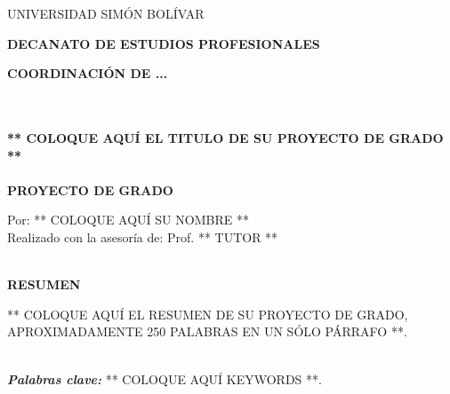 \watermarkoff
\begin{resumen}
\begin{center}
\begin{large}
	UNIVERSIDAD SIMÓN BOLÍVAR
\end{large}

\textbf{DECANATO DE ESTUDIOS PROFESIONALES}

\textbf{COORDINACIÓN DE ...}

~\\
~\\
\textbf{** COLOQUE AQUÍ EL TITULO DE SU PROYECTO DE GRADO **}
~\\
~\\
\textbf{PROYECTO DE GRADO}


Por: ** COLOQUE AQUÍ SU NOMBRE **\\
Realizado con la asesoría de: Prof. ** TUTOR **

~\\

\textbf{RESUMEN}
\end{center}



** COLOQUE AQUÍ EL RESUMEN DE SU PROYECTO DE GRADO, APROXIMADAMENTE 250 PALABRAS EN UN SÓLO PÁRRAFO **.

~\\
\textit{\textbf{Palabras clave:}} ** COLOQUE AQUÍ KEYWORDS **.

\end{resumen}